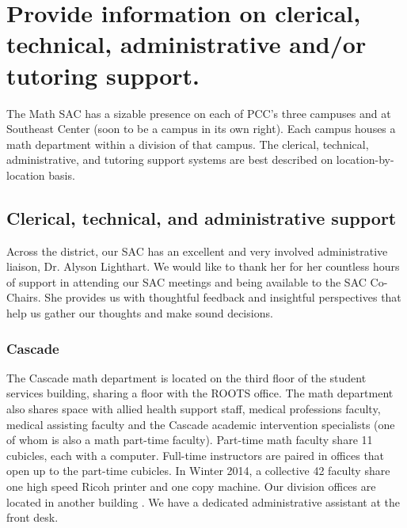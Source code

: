 


\section[Clerical, technical, administrative and/or tutoring support]{Provide information on clerical, technical, administrative and/or tutoring support.}

The Math SAC has a sizable presence on each of PCC's three campuses and at Southeast Center (soon to be
a campus in its own right). Each campus houses a math department within a division of that campus. The clerical, technical, administrative, and tutoring support systems are best described on location-by-location basis.

\subsection{Clerical, technical, and administrative support}

Across the district, our SAC has an excellent and very involved administrative liaison, Dr. Alyson Lighthart. We would like to thank her for her countless hours of support in attending our SAC meetings and being available to the SAC Co-Chairs. She provides us with thoughtful feedback and insightful perspectives that help us gather our thoughts and make sound decisions. 

\subsubsection{Cascade}
The Cascade math department is located on the third floor of the student services building, sharing a floor with the ROOTS office. The math department also shares space with allied health support staff, medical professions faculty, medical assisting faculty and the Cascade academic intervention specialists (one of whom is also a math part-time faculty).  Part-time math faculty share 11 cubicles, each with a computer. Full-time instructors are paired in offices that open up to the part-time cubicles. In Winter 2014, a collective 42 faculty share one high speed Ricoh printer and one copy machine. Our division offices are located in another building . We have a dedicated administrative assistant at the front desk. 

